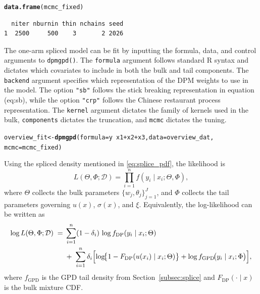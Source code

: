 \documentclass[article]{jss}\usepackage[]{graphicx}\usepackage[]{xcolor}
\makeatletter
\newcommand{\hlopt}[1]{\textcolor[rgb]{0,0,0}{#1}}%
\newcommand{\hldef}[1]{\textcolor[rgb]{0.345,0.345,0.345}{#1}}%
\newcommand{\hlkwb}[1]{\textcolor[rgb]{0.69,0.353,0.396}{#1}}%
\newcommand{\hlkwc}[1]{\textcolor[rgb]{0.333,0.667,0.333}{#1}}%
\newcommand{\hlkwd}[1]{\textcolor[rgb]{0.737,0.353,0.396}{\textbf{#1}}}%
\newenvironment{kframe}{%
 \def\at@end@of@kframe{}%
 \ifinner\ifhmode%
  \def\at@end@of@kframe{\end{minipage}}%
  \begin{minipage}{\columnwidth}%
 \fi\fi%
 \def\FrameCommand##1{\hskip\@totalleftmargin \hskip-\fboxsep
 \colorbox{shadecolor}{##1}\hskip-\fboxsep
     \hskip-\linewidth \hskip-\@totalleftmargin \hskip\columnwidth}%
 \MakeFramed {\advance\hsize-\width
   \@totalleftmargin\z@ \linewidth\hsize
   \@setminipage}}%
 {\par\unskip\endMakeFramed%
 \at@end@of@kframe}
\newenvironment{knitrout}{}{} %
\DeclareRobustCommand{\code}[1]{\nolinkurl{#1}}
\makeatother
\begin{document}
\begin{knitrout}\footnotesize
{}\color{fgcolor}\begin{kframe}
\begin{alltt}
\hlkwd{data.frame}\hldef{(mcmc_fixed)}
\end{alltt}
\begin{verbatim}
  niter nburnin thin nchains seed
1  2500     500    3       2 2026
\end{verbatim}
\end{kframe}
\end{knitrout}
The one-arm spliced model can be fit by inputting the formula, data, and control arguments to \code{dpmgpd()}. The \code{formula} argument follows standard \textsf{R} syntax and dictates which covariates to include in both the bulk and tail components. The  \code{backend}  argument specifies which representation of the DPM weights to use in the model. The option \code{"sb"} follows the stick breaking representation in equation (eq:sb), while the option \code{"crp"} follows the Chinese restaurant process representation. The \code{kernel} argument dictates the family of kernels used in the bulk, \code{components} dictates the truncation, and \code{mcmc} dictates the tuning.

\begin{knitrout}\footnotesize
{}\color{fgcolor}\begin{kframe}
\begin{alltt}
\hldef{overview_fit} \hlkwb{<-} \hlkwd{dpmgpd}\hldef{(}\hlkwc{formula} \hldef{= y} \hlopt{~} \hldef{x1} \hlopt{+} \hldef{x2} \hlopt{+} \hldef{x3,} \hlkwc{data} \hldef{= overview_dat,}
                        \hlkwc{mcmc} \hldef{= mcmc_fixed)}
\end{alltt}
\end{kframe}
\end{knitrout}

Using the spliced density mentioned in
\eqref{eq:splice_pdf}, the likelihood is
\begin{equation}
  L(\Theta,\Phi;\mathcal{D})
  =\prod_{i=1}^n f(y_i\mid x_i;\Theta,\Phi),
  \label{eq:overview-lik}
\end{equation} where $\Theta$ collects the bulk
parameters $\{w_j,\theta_j\}_{j=1}^J$, and $\Phi$ collects the tail
parameters governing $u(x)$, $\sigma(x)$, and $\xi$. Equivalently, the
log-likelihood can be written as \begin{align}
  \log L(\Theta,\Phi;\mathcal{D})
  \;=&\;\sum_{i=1}^n (1-\delta_i)\,\log f_{\mathrm{DP}}(y_i\mid x_i;\Theta)
  \nonumber\\
  &\;+\;\sum_{i=1}^n \delta_i
  \Bigl[
    \log\!\bigl\{1-F_{\mathrm{DP}}(u(x_i)\mid x_i;\Theta)\bigr\}
    +\log f_{\mathrm{GPD}}\!\bigl(y_i\mid x_i;\Phi\bigr)
  \Bigr],
  \label{eq:overview-loglik}
\end{align} where $f_{\mathrm{GPD}}$ is the GPD tail density from
Section~\ref{subsec:splice} and
$F_{\mathrm{DP}}(\cdot\mid x)$ is the bulk mixture CDF.
\end{document}
